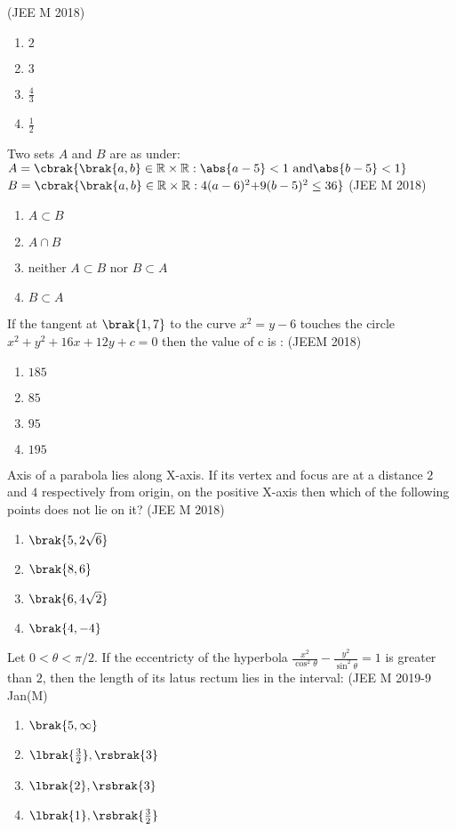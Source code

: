      \hfill{(JEE M 2018)}
	\begin{enumerate}
    		\item $2$
    		\item $3$
    		\item $\frac{4}{3}$
    		\item $\frac{1}{2}$
	\end{enumerate}
\item  Two sets $A$ and $B$ are as under:
$A=\cbrak{\brak{a,b}\in\mathbb{R}\times\mathbb{R}:\abs{a-5}<1\text{ and} \abs{b-5}<1}$
$B=\cbrak{\brak{a,b}\in\mathbb{R}\times\mathbb{R}:4(a-6)^2\text{+}9(b-5)^2\leq36}$
    \hfill{(JEE M 2018)}
	\begin{enumerate}
		\item $A\subset B$ 
		\item $A\cap B$
		\item neither $A\subset B$ nor $B\subset A$
		\item $B\subset A$
	\end{enumerate}
\item If the tangent at $\brak{1,7}$ to the curve $x^2=y-6$ touches the circle $x^2+y^2+16x+12y+c=0$ then the value of c is :
       \hfill{(JEEM 2018)}
	\begin{enumerate}
    		\item $185$
    		\item $85$
    		\item $95$
    		\item $195$
	\end{enumerate} 
\item Axis of a parabola lies along X-axis. If its vertex and focus are at a distance $2$ and $4$ respectively from origin, on the positive X-axis then which of the following points does not lie on it? 
     \hfill{(JEE M 2018)} 
	\begin{enumerate}
    		\item $\brak{5,2\sqrt6}$
    		\item $\brak{8,6}$
    		\item $\brak{6,4\sqrt2}$
    		\item $\brak{4,-4}$
	\end{enumerate}
\item Let $0<\theta<\pi/2$. If the eccentricty of the hyperbola $\frac{x^2}{\cos^2{\theta}} - \frac{y^2}{\sin^2{\theta}} = 1$ is greater than $2$, then the length of its latus rectum lies in the interval:
          \hfill{(JEE M 2019-9 Jan(M)}
	\begin{enumerate}
    		\item $\brak{5,\infty}$
    		\item $\lbrak{\frac{3}{2}},\rsbrak{3}$
    		\item $\lbrak{2},\rsbrak{3}$ 
    		\item $\lbrak{1},\rsbrak{\frac{3}{2}}$
	\end{enumerate} 

